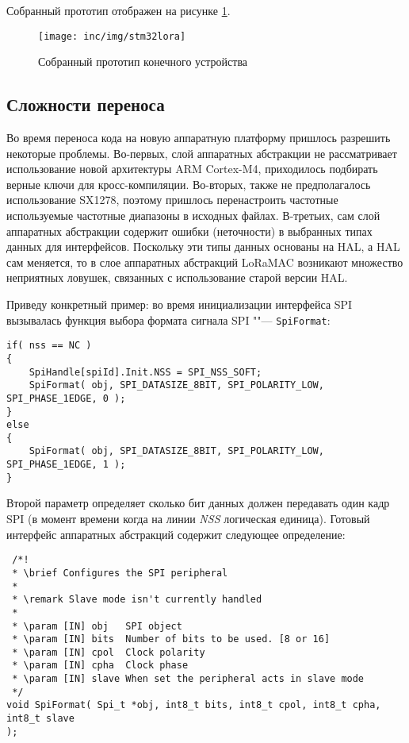 Собранный прототип отображен на рисунке \ref{fig:stm32lora}.

\begin{figure}[!h]
  \centering
  \texttt{[image: inc/img/stm32lora]}
  \caption{Собранный прототип конечного устройства}
  \label{fig:stm32lora}
\end{figure}

\subsection{Сложности переноса}

Во время переноса кода на новую аппаратную платформу пришлось разрешить 
некоторые проблемы.
Во-первых, слой аппаратных абстракции не рассматривает использование новой
архитектуры ARM Cortex-M4, приходилось подбирать верные ключи для 
кросс-компиляции. 
Во-вторых, также не предполагалось использование SX1278, поэтому пришлось 
перенастроить частотные используемые частотные диапазоны в исходных файлах.
В-третьих, сам слой аппаратных абстракции содержит ошибки (неточности) в 
выбранных типах данных для интерфейсов.
Поскольку эти типы данных основаны на HAL, а HAL сам меняется, то в слое 
аппаратных абстракций LoRaMAC возникают множество неприятных ловушек, связанных 
с использование старой версии HAL.

Приведу конкретный пример: во время инициализации интерфейса SPI вызывалась 
функция выбора формата сигнала SPI ""--- \texttt{SpiFormat}:

\begin{verbatim}
if( nss == NC )
{
    SpiHandle[spiId].Init.NSS = SPI_NSS_SOFT;
    SpiFormat( obj, SPI_DATASIZE_8BIT, SPI_POLARITY_LOW, SPI_PHASE_1EDGE, 0 );
}
else
{
    SpiFormat( obj, SPI_DATASIZE_8BIT, SPI_POLARITY_LOW, SPI_PHASE_1EDGE, 1 );
}
\end{verbatim}

Второй параметр определяет сколько бит данных должен передавать один кадр SPI 
(в момент времени когда на линии \textit{NSS} логическая единица).
Готовый интерфейс аппаратных абстракций содержит следующее определение:
\begin{verbatim}
 /*!
 * \brief Configures the SPI peripheral
 *
 * \remark Slave mode isn't currently handled
 *
 * \param [IN] obj   SPI object
 * \param [IN] bits  Number of bits to be used. [8 or 16]
 * \param [IN] cpol  Clock polarity
 * \param [IN] cpha  Clock phase
 * \param [IN] slave When set the peripheral acts in slave mode
 */
void SpiFormat( Spi_t *obj, int8_t bits, int8_t cpol, int8_t cpha, int8_t slave 
);
\end{verbatim}

